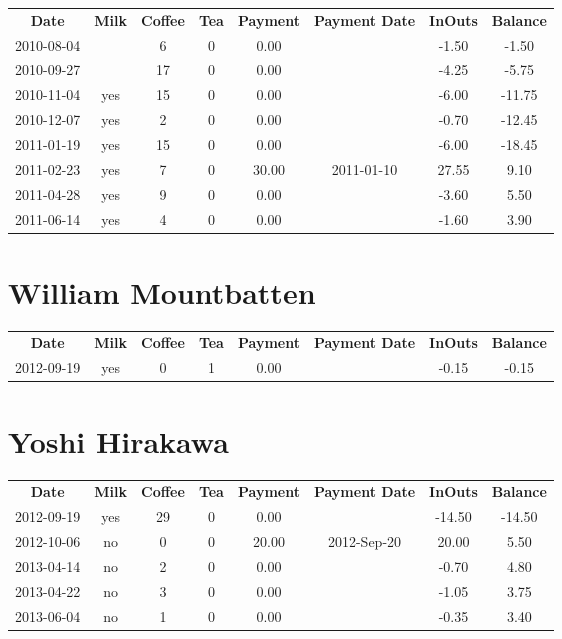 \begin{center}
\begin{tabular}{cccccccc}
\textbf{Date} & \textbf{Milk} & \textbf{Coffee} & \textbf{Tea} & \textbf{Payment} & \textbf{Payment Date} & \textbf{InOuts} & \textbf{Balance} \\
2010-08-04 &  &  6 & 0 &  0.00 &  & -1.50 &  -1.50\\ 
2010-09-27 &  & 17 & 0 &  0.00 &  & -4.25 &  -5.75\\ 
2010-11-04 & yes & 15 & 0 &  0.00 &  & -6.00 & -11.75\\ 
2010-12-07 & yes &  2 & 0 &  0.00 &  & -0.70 & -12.45\\ 
2011-01-19 & yes & 15 & 0 &  0.00 &  & -6.00 & -18.45\\ 
2011-02-23 & yes &  7 & 0 & 30.00 & 2011-01-10 & 27.55 &   9.10\\ 
2011-04-28 & yes &  9 & 0 &  0.00 &  & -3.60 &   5.50\\ 
2011-06-14 & yes &  4 & 0 &  0.00 &  & -1.60 &   3.90
\end{tabular}
\end{center}

\section{William Mountbatten}

\begin{center}
\begin{tabular}{cccccccc}
\textbf{Date} & \textbf{Milk} & \textbf{Coffee} & \textbf{Tea} & \textbf{Payment} & \textbf{Payment Date} & \textbf{InOuts} & \textbf{Balance} \\
2012-09-19 & yes & 0 & 1 & 0.00 &  & -0.15 & -0.15
\end{tabular}
\end{center}

\section{Yoshi Hirakawa}

\begin{center}
\begin{tabular}{cccccccc}
\textbf{Date} & \textbf{Milk} & \textbf{Coffee} & \textbf{Tea} & \textbf{Payment} & \textbf{Payment Date} & \textbf{InOuts} & \textbf{Balance} \\
2012-09-19 & yes & 29 & 0 &  0.00 &  & -14.50 & -14.50\\ 
2012-10-06 & no &  0 & 0 & 20.00 & 2012-Sep-20 &  20.00 &   5.50\\ 
2013-04-14 & no &  2 & 0 &  0.00 &  &  -0.70 &   4.80\\ 
2013-04-22 & no &  3 & 0 &  0.00 &  &  -1.05 &   3.75\\ 
2013-06-04 & no &  1 & 0 &  0.00 &  &  -0.35 &   3.40
\end{tabular}
\end{center}

